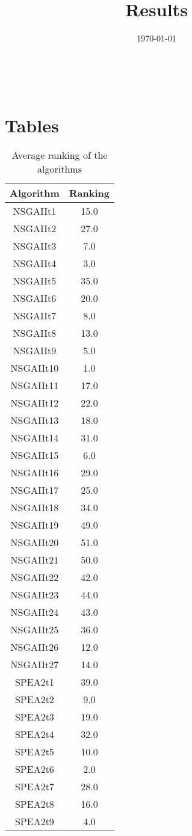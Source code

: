 \documentclass{article}
\title{Results}
\author{}
\date{\today}
\begin{document}
\oddsidemargin 0in \topmargin 0in\maketitle
\
\section{Tables}
\begin{table}[!htp]
\centering
\caption{Average ranking of the algorithms}
\begin{tabular}{c|c}
Algorithm&Ranking\\
\hline
NSGAIIt1&15.0\\
NSGAIIt2&27.0\\
NSGAIIt3&7.0\\
NSGAIIt4&3.0\\
NSGAIIt5&35.0\\
NSGAIIt6&20.0\\
NSGAIIt7&8.0\\
NSGAIIt8&13.0\\
NSGAIIt9&5.0\\
NSGAIIt10&1.0\\
NSGAIIt11&17.0\\
NSGAIIt12&22.0\\
NSGAIIt13&18.0\\
NSGAIIt14&31.0\\
NSGAIIt15&6.0\\
NSGAIIt16&29.0\\
NSGAIIt17&25.0\\
NSGAIIt18&34.0\\
NSGAIIt19&49.0\\
NSGAIIt20&51.0\\
NSGAIIt21&50.0\\
NSGAIIt22&42.0\\
NSGAIIt23&44.0\\
NSGAIIt24&43.0\\
NSGAIIt25&36.0\\
NSGAIIt26&12.0\\
NSGAIIt27&14.0\\
SPEA2t1&39.0\\
SPEA2t2&9.0\\
SPEA2t3&19.0\\
SPEA2t4&32.0\\
SPEA2t5&10.0\\
SPEA2t6&2.0\\
SPEA2t7&28.0\\
SPEA2t8&16.0\\
SPEA2t9&4.0\\

\end{tabular}
\end{table}
\end{document}

